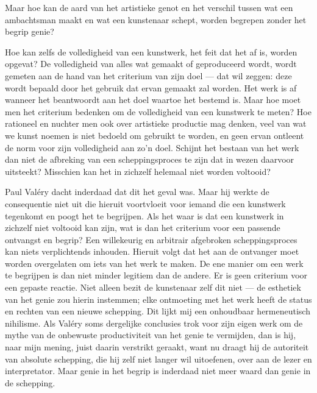 Maar hoe kan de aard van het artistieke genot en het verschil tussen wat een ambachtsman maakt en wat een kunstenaar schept, worden begrepen zonder het begrip genie? 

Hoe kan zelfs de volledigheid van een kunstwerk, het feit dat het af is, worden opgevat? De volledigheid van alles wat gemaakt of geproduceerd wordt, wordt gemeten aan de hand van het criterium van zijn doel — dat wil zeggen: deze wordt bepaald door het gebruik dat ervan gemaakt zal worden. Het werk is af wanneer het beantwoordt aan het doel waartoe het bestemd is. Maar hoe moet men het criterium bedenken om de volledigheid van een kunstwerk te meten? Hoe rationeel en nuchter men ook over artistieke productie mag denken, veel van wat we kunst noemen is niet bedoeld om gebruikt te worden, en geen ervan ontleent de norm voor zijn volledigheid aan zo’n doel. Schijnt het bestaan van het werk dan niet de afbreking van een scheppingsproces te zijn dat in wezen daarvoor uitsteekt? Misschien kan het in zichzelf helemaal niet worden voltooid?

Paul Valéry dacht inderdaad dat dit het geval was. Maar hij werkte de consequentie niet uit die hieruit voortvloeit voor iemand die een kunstwerk tegenkomt en poogt het te begrijpen. Als het waar is dat een kunstwerk in zichzelf niet voltooid kan zijn, wat is dan het criterium voor een passende ontvangst en begrip? Een willekeurig en arbitrair afgebroken scheppingsproces kan niets verplichtends inhouden. Hieruit volgt dat het aan de ontvanger moet worden overgelaten om iets van het werk te maken. De ene manier om een werk te begrijpen is dan niet minder legitiem dan de andere. Er is geen criterium voor een gepaste reactie. Niet alleen bezit de kunstenaar zelf dit niet — de esthetiek van het genie zou hierin instemmen; elke ontmoeting met het werk heeft de status en rechten van een nieuwe schepping. Dit lijkt mij een onhoudbaar hermeneutisch nihilisme. Als Valéry soms dergelijke conclusies trok voor zijn eigen werk om de mythe van de onbewuste productiviteit van het genie te vermijden, dan is hij, naar mijn mening, juist daarin verstrikt geraakt, want nu draagt hij de autoriteit van absolute schepping, die hij zelf niet langer wil uitoefenen, over aan de lezer en interpretator. Maar genie in het begrip is inderdaad niet meer waard dan genie in de schepping.

